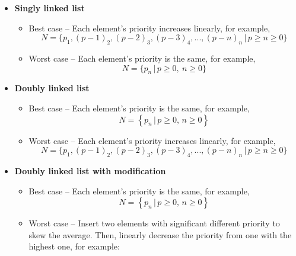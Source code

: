 \documentclass[a4paper,11pt]{kth-mag}
\begin{document}
\begin{itemize}
    \item \textbf{Singly linked list}
        \begin{itemize}
            \item Best case -- Each element's priority increases linearly, for example,
                \begin{equation*}
                    N = \Big\{p_1, (p-1)_2, (p-2)_3, (p-3)_4,...,(p-n)_n \, \Big| \, p \ge n \ge 0 \Big\}
                \end{equation*}
            \item Worst case -- Each element's priority is the same, for example,
                \begin{equation*}
                    N = \Big\{p_{n} \, \Big| \, p \ge 0,\ n \ge 0 \Big\}
                \end{equation*}
        \end{itemize}
    \item \textbf{Doubly linked list}
        \begin{itemize}
            \item Best case -- Each element's priority is the same, for example,
                \begin{equation*}
                    N = \left\{p_{n} \, \Big| \, p \ge 0,\, n \ge 0 \right\}
                \end{equation*}
            \item Worst case -- Each element's priority increases linearly, for example,
                \begin{equation*}
                    N = \Big\{p_1, (p-1)_2, (p-2)_3, (p-3)_4,...,(p-n)_n \, \Big| \, p \ge n\ge 0 \Big\}
                \end{equation*}
        \end{itemize}
    \item \textbf{Doubly linked list with modification}
        \begin{itemize}
            \item Best case -- Each element's priority is the same, for example,
                \begin{equation*}
                    N = \left\{p_{n} \, \Big| \, p \ge 0,\, n \ge 0 \right\}
                \end{equation*}
            \item Worst case -- Insert two elements with significant different priority to skew the average.
                Then, linearly decrease the priority from one with the highest one, for example:

\end{itemize}
\end{itemize}
\end{document}
